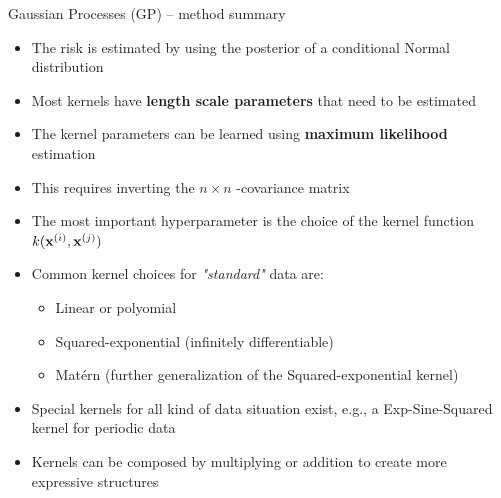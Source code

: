 \begin{frame}{Gaussian Processes (GP) -- method summary}
    
    \begin{itemize}
        \item The risk is estimated by using the posterior of a conditional Normal distribution
        \item Most kernels have \textbf{length scale parameters} that need to be estimated
    \end{itemize}
    \begin{itemize}
        \item The kernel parameters can be learned using \textbf{maximum likelihood} estimation
        \item This requires inverting the $n\times n$ -covariance matrix
    \end{itemize}
    \begin{itemize}
        \item The most important hyperparameter is the choice of the kernel function $k(\mathbf{x}^{(i)}, \mathbf{x}^{(j)})$
        \item Common kernel choices for \textit{"standard"} data are:
        \begin{itemize}
            \item Linear or polyomial
            \item Squared-exponential (infinitely differentiable)
            \item Matérn (further generalization of the Squared-exponential kernel)
        \end{itemize}
        \item Special kernels for all kind of data situation exist, e.g., a Exp-Sine-Squared kernel for periodic data
        \item Kernels can be composed by multiplying or addition to create more expressive structures
    \end{itemize}
    
\end{frame}


